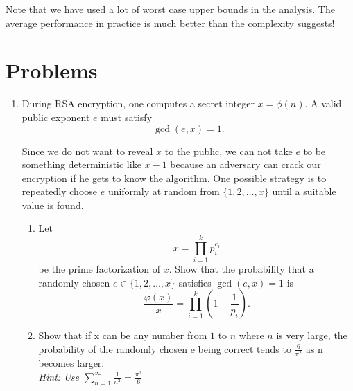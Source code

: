 \noindent Note that we have used a lot of worst case upper bounds in the analysis. The average 
performance in practice is much better than the complexity suggests! 


\clearpage
\section{Problems}
\begin{enumerate}
\item[\textbf{1}]
During RSA encryption, one computes a secret integer \(x=\phi(n)\).
A valid public exponent \(e\) must satisfy
\[
\gcd(e,x)=1.
\]

Since we do not want to reveal \(x\) to the public, we can not take \(e\) to be something 
deterministic like $x-1$ because an adversary can crack our encryption if he gets to know the algorithm.
One possible strategy is to repeatedly choose \(e\) uniformly at random from
\(\{1,2,\dots,x\}\) until a suitable value is found.

\begin{enumerate}[label=\textbf{(\alph*)}]
\item Let
\[
x=\prod_{i=1}^{k} p_i^{e_i}
\]
be the prime factorization of \(x\). Show that the probability that a randomly
chosen \(e\in\{1,2,\dots,x\}\) satisfies \(\gcd(e,x)=1\) is
\[
\frac{\varphi(x)}{x} = \prod_{i=1}^{k}\left(1-\frac{1}{p_i}\right).
\]

\item Show that if x can be any number from $1$ to $n$ where $n$ is very large,
the probability of the randomly chosen e being correct tends to $\frac{6}{\pi^2}$ as n becomes larger.\\
\textit{Hint: Use $\sum_{n=1}^{\infty} \frac{1}{n^2}= \frac{\pi^2}{6}$}
\end{enumerate}
\end{enumerate}
